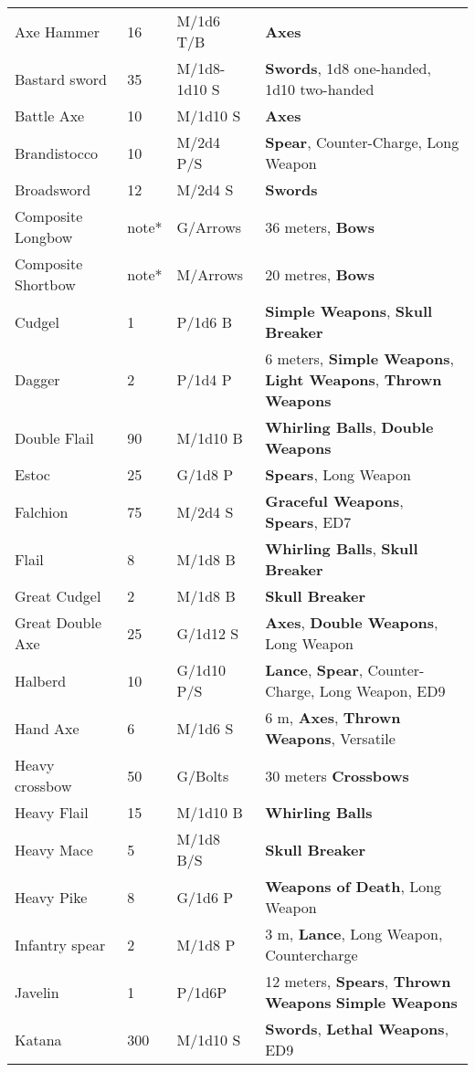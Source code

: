 \documentclass[a4paper,12 pt,openany]{book}
\begin{document}
\begin{textblock*}{19.5cm}
\begin{tabularx}{0.95\textwidth}{llll}
Axe Hammer& 16 & M/1d6 T/B& \textbf{Axes}\\
Bastard sword& 35 & M/1d8-1d10 S&\textbf{Swords}, 1d8 one-handed, 1d10 two-handed\\
Battle Axe& 10 & M/1d10 S&\textbf{Axes}\\
Brandistocco& 10 & M/2d4 P/S& \textbf{Spear}, Counter-Charge, Long Weapon\\
Broadsword& 12 & M/2d4 S&\textbf{Swords}\\
Composite Longbow& note*& G/Arrows& 36 meters, \textbf{Bows}\\
Composite Shortbow& note*& M/Arrows& 20 metres, \textbf{Bows}\\
Cudgel& 1& P/1d6 B& \textbf{Simple Weapons}, \textbf{Skull Breaker}\\
Dagger& 2& P/1d4 P& 6 meters, \textbf{Simple Weapons}, \textbf{Light Weapons}, \textbf{Thrown Weapons}\\
Double Flail& 90 & M/1d10 B& \textbf{Whirling Balls}, \textbf{Double Weapons}\\
Estoc& 25& G/1d8 P& \textbf{Spears}, Long Weapon\\
Falchion& 75 & M/2d4 S& \textbf{Graceful Weapons}, \textbf{Spears}, ED7\\
Flail& 8& M/1d8 B& \textbf{Whirling Balls}, \textbf{Skull Breaker}\\
Great Cudgel& 2& M/1d8 B&\textbf{Skull Breaker}\\
Great Double Axe& 25 & G/1d12 S& \textbf{Axes}, \textbf{Double Weapons}, Long Weapon\\
Halberd& 10 & G/1d10 P/S& \textbf{Lance}, \textbf{Spear}, Counter-Charge, Long Weapon, ED9 \\
Hand Axe& 6 & M/1d6 S& 6 m, \textbf{Axes}, \textbf{Thrown Weapons}, Versatile\\
Heavy crossbow& 50 & G/Bolts& 30 meters \textbf{Crossbows}\\
Heavy Flail& 15 & M/1d10 B& \textbf{Whirling Balls}\\
Heavy Mace& 5& M/1d8 B/S& \textbf{Skull Breaker}\\
Heavy Pike& 8& G/1d6 P&\textbf{Weapons of Death}, Long Weapon\\
Infantry spear& 2& M/1d8 P&3 m, \textbf{Lance}, Long Weapon, Countercharge\\
Javelin& 1& P/1d6P& 12 meters, \textbf{Spears}, \textbf{Thrown Weapons} \textbf{Simple Weapons}\\
Katana& 300& M/1d10 S& \textbf{Swords}, \textbf{Lethal Weapons}, ED9\\

\end{tabularx}
\end{textblock*}
\end{document}
